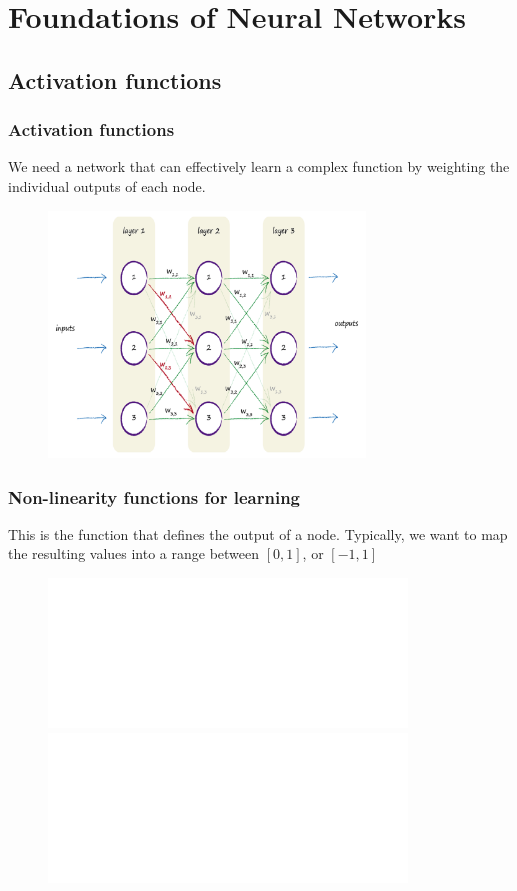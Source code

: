 \documentclass[hyperref={colorlinks=true}]{beamer}
\begin{document}
\section[Foundations of Neural Networks]{Foundations of Neural Networks}

\subsection[Activation functions]{Activation functions}

\begin{frame}%
  \frametitle{Activation functions}

  We need a network that can effectively learn a complex function by weighting the individual outputs of each node.  
    
  \begin{figure}
    \centering
    \includegraphics[width=0.75\textwidth]{NN-2layer.png}%
  \end{figure}
    
\end{frame}





\begin{frame}%
  \frametitle{Non-linearity functions for learning}

  This is the function that defines the output of a node. Typically, we want to map the resulting values into a range between $[0, 1]$, or  $[-1,1]$
    
  \begin{figure}
    \centering
    \includegraphics<1>[width=0.85\textwidth]{NonLinearFunction.pdf}%
    \includegraphics<2>[width=0.85\textwidth]{NonLinearFunction-2.pdf}%
  \end{figure}
    
\end{frame}
\end{document}
